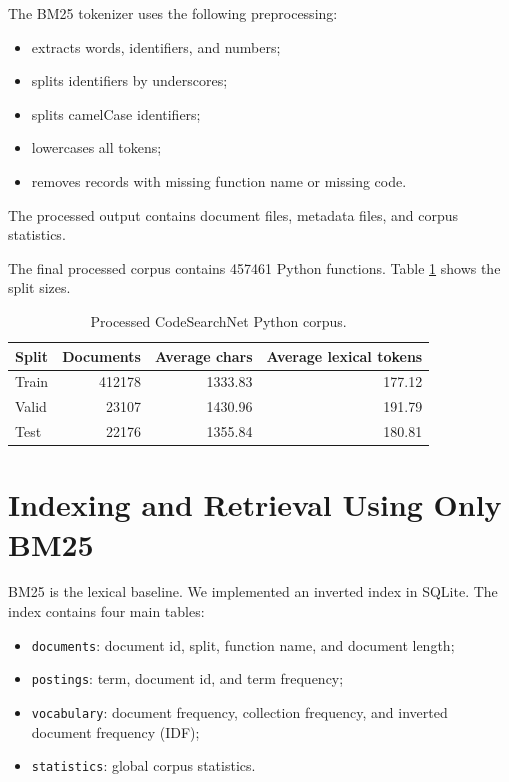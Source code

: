 \documentclass[11pt]{article}
\begin{document}
The BM25 tokenizer uses the following preprocessing:
\begin{itemize}
    \item extracts words, identifiers, and numbers;
    \item splits identifiers by underscores;
    \item splits camelCase identifiers;
    \item lowercases all tokens;
    \item removes records with missing function name or missing code.
\end{itemize}

The processed output contains document files, metadata files, and corpus
statistics.

The final processed corpus contains 457461 Python functions. Table
\ref{tab:data} shows the split sizes.

\begin{table}[h]
\centering
\begin{tabular}{lrrr}
\toprule
Split & Documents & Average chars & Average lexical tokens \\
\midrule
Train & 412178 & 1333.83 & 177.12 \\
Valid & 23107 & 1430.96 & 191.79 \\
Test & 22176 & 1355.84 & 180.81 \\
\bottomrule
\end{tabular}
\caption{Processed CodeSearchNet Python corpus.}
\label{tab:data}
\end{table}

\section{Indexing and Retrieval Using Only BM25}

BM25 is the lexical baseline. We implemented an inverted index in SQLite. The
index contains four main tables:
\begin{itemize}
    \item \texttt{documents}: document id, split, function name, and document length;
    \item \texttt{postings}: term, document id, and term frequency;
    \item \texttt{vocabulary}: document frequency, collection frequency, and inverted document frequency (IDF);
    \item \texttt{statistics}: global corpus statistics.
\end{itemize}
\\
\end{document}
